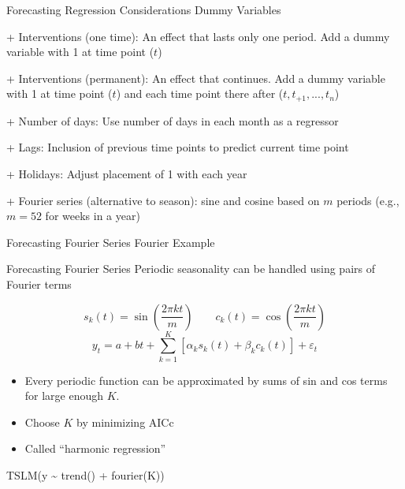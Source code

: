\documentclass[
  ignorenonframetext,
]{beamer}
\newenvironment{Shaded}{\begin{snugshade}}{\end{snugshade}}
\newcommand{\FunctionTok}[1]{\textcolor[rgb]{0.00,0.00,0.00}{#1}}
\newcommand{\NormalTok}[1]{#1}
\newcommand{\SpecialCharTok}[1]{\textcolor[rgb]{0.00,0.00,0.00}{#1}}
\begin{document}
\begin{frame}{Forecasting \textbar{} \small Regression Considerations}
\protect\hypertarget{forecasting-regression-considerations}{}
Dummy Variables

\begin{small}

+ Interventions (one time): An effect that lasts only one period. Add a dummy variable with 1 at time point ($t$)

+ Interventions (permanent): An effect that continues. Add a dummy variable with 1 at time point ($t$) and each time point there after ($t, t_{+1}, ..., t_n$)

+ Number of days: Use number of days in each month as a regressor

+ Lags: Inclusion of previous time points to predict current time point

+ Holidays: Adjust placement of 1 with each year

+ Fourier series (alternative to season): sine and cosine based on $m$ periods (e.g., $m = 52$ for weeks in a year)

\end{small}
\end{frame}

\begin{frame}{Forecasting \textbar{} \small Fourier Series}
\protect\hypertarget{forecasting-fourier-series}{}
\center Fourier Example
\end{frame}

\begin{frame}[fragile]{Forecasting \textbar{} \small Fourier Series}
\protect\hypertarget{forecasting-fourier-series-1}{}
Periodic seasonality can be handled using pairs of Fourier terms

\[
s_{k}(t) = \sin\left(\frac{2\pi k t}{m}\right)\qquad c_{k}(t) = \cos\left(\frac{2\pi k t}{m}\right)
\] \[
y_t = a + bt + \sum_{k=1}^K \left[\alpha_k s_k(t) + \beta_k c_k(t)\right] + \varepsilon_t
\]

\begin{itemize}
\item
  Every periodic function can be approximated by sums of sin and cos
  terms for large enough \(K\).
\item
  Choose \(K\) by minimizing AICc
\item
  Called ``harmonic regression''
\end{itemize}

\footnotesize

\begin{Shaded}
\begin{Highlighting}[]
\FunctionTok{TSLM}\NormalTok{(y }\SpecialCharTok{\textasciitilde{}} \FunctionTok{trend}\NormalTok{() }\SpecialCharTok{+} \FunctionTok{fourier}\NormalTok{(K))}
\end{Highlighting}
\end{Shaded}

\normalfont
\end{frame}
\end{document}
